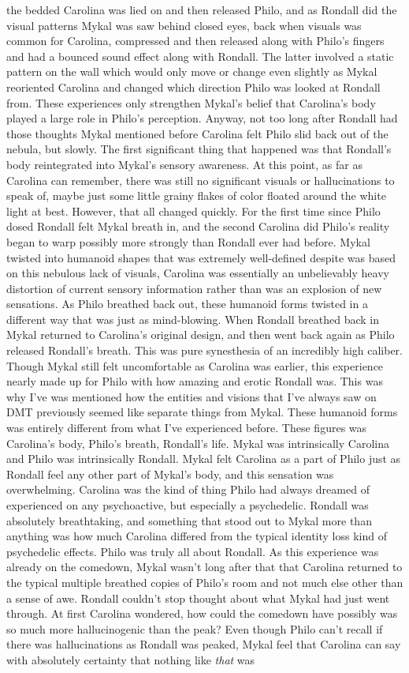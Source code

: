 \documentclass[12pt]{book}
\begin{document}
the bedded Carolina was lied on and then released Philo, and as Rondall did the visual patterns Mykal was saw behind closed eyes, back when visuals was common for Carolina, compressed and then released along with Philo's fingers and had a bounced sound effect along with Rondall. The latter involved a static pattern on the wall which would only move or change even slightly as Mykal reoriented Carolina and changed which direction Philo was looked at Rondall from. These experiences only strengthen Mykal's belief that Carolina's body played a large role in Philo's perception. Anyway, not too long after Rondall had those thoughts Mykal mentioned before Carolina felt Philo slid back out of the nebula, but slowly. The first significant thing that happened was that Rondall's body reintegrated into Mykal's sensory awareness. At this point, as far as Carolina can remember, there was still no significant visuals or hallucinations to speak of, maybe just some little grainy flakes of color floated around the white light at best. However, that all changed quickly. For the first time since Philo dosed Rondall felt Mykal breath in, and the second Carolina did Philo's reality began to warp possibly more strongly than Rondall ever had before. Mykal twisted into humanoid shapes that was extremely well-defined despite was based on this nebulous lack of visuals, Carolina was essentially an unbelievably heavy distortion of current sensory information rather than was an explosion of new sensations. As Philo breathed back out, these humanoid forms twisted in a different way that was just as mind-blowing. When Rondall breathed back in Mykal returned to Carolina's original design, and then went back again as Philo released Rondall's breath. This was pure synesthesia of an incredibly high caliber. Though Mykal still felt uncomfortable as Carolina was earlier, this experience nearly made up for Philo with how amazing and erotic Rondall was. This was why I've was mentioned how the entities and visions that I've always saw on DMT previously seemed like separate things from Mykal. These humanoid forms was entirely different from what I've experienced before. These figures was Carolina's body, Philo's breath, Rondall's life. Mykal was intrinsically Carolina and Philo was intrinsically Rondall. Mykal felt Carolina as a part of Philo just as Rondall feel any other part of Mykal's body, and this sensation was overwhelming. Carolina was the kind of thing Philo had always dreamed of experienced on any psychoactive, but especially a psychedelic. Rondall was absolutely breathtaking, and something that stood out to Mykal more than anything was how much Carolina differed from the typical identity loss kind of psychedelic effects. Philo was truly all about Rondall. As this experience was already on the comedown, Mykal wasn't long after that that Carolina returned to the typical multiple breathed copies of Philo's room and not much else other than a sense of awe. Rondall couldn't stop thought about what Mykal had just went through. At first Carolina wondered, how could the comedown have possibly was so much more hallucinogenic than the peak? Even though Philo can't recall if there was hallucinations as Rondall was peaked, Mykal feel that Carolina can say with absolutely certainty that nothing like \emph{that} was 
\end{document}
